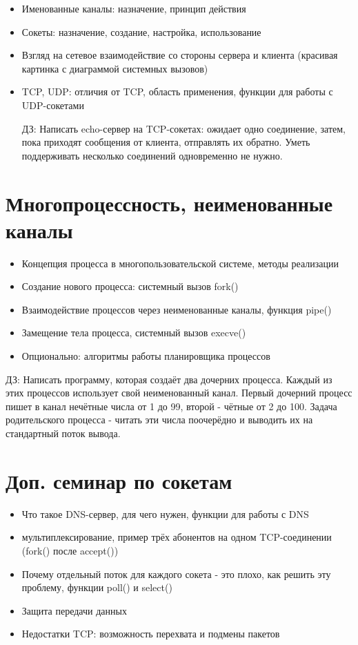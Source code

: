 \documentclass{article}
\begin{document}
    \begin{itemize}
        \item Именованные каналы: назначение, принцип действия
        \item Сокеты: назначение, создание, настройка, использование
        \item Взгляд на сетевое взаимодействие со стороны сервера и клиента (красивая картинка с диаграммой системных вызовов)
        \item TCP, UDP: отличия от TCP, область применения, функции для работы с UDP-сокетами
       
        ДЗ: Написать echo-сервер на TCP-сокетах: ожидает одно соединение, затем, пока приходят сообщения от клиента, отправлять их обратно.
            Уметь поддерживать несколько соединений одновременно не нужно.
    \end{itemize}

\section{Многопроцессность, неименованные каналы}

    \begin{itemize}
        \item Концепция процесса в многопользовательской системе, методы реализации
        \item Создание нового процесса: системный вызов fork()
        \item Взаимодействие процессов через неименованные каналы, функция pipe()
        \item Замещение тела процесса, системный вызов execve()
        \item Опционально: алгоритмы работы планировщика процессов
    \end{itemize}
        
     ДЗ:
         Написать программу, которая создаёт два дочерних процесса. Каждый из этих процессов использует свой неименованный канал.
         Первый дочерний процесс пишет в канал нечётные числа от 1 до 99, второй - чётные от 2 до 100. Задача родительского
         процесса - читать эти числа поочерёдно и выводить их на стандартный поток вывода.

\section{Доп. семинар по сокетам}

    \begin{itemize}
        \item Что такое DNS-сервер, для чего нужен, функции для работы с DNS
        \item мультиплексирование, пример трёх абонентов на одном TCP-соединении (fork() после accept())
        \item Почему отдельный поток для каждого сокета - это плохо, как решить эту проблему, функции poll() и select()
        \item Защита передачи данных
        \item Недостатки TCP: возможность перехвата и подмены пакетов
    \end{itemize}
\end{document}
